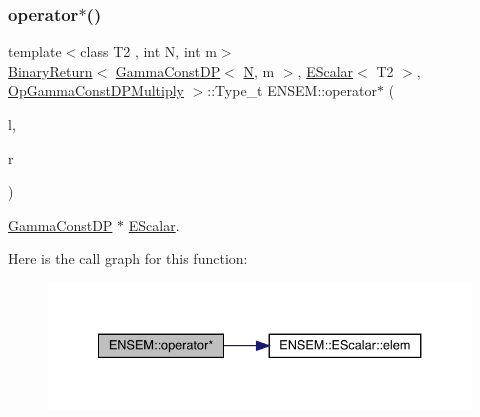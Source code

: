 \subsubsection{\texorpdfstring{operator$\ast$()}{operator*()}\hspace{0.1cm}{\footnotesize\ttfamily [6/9]}}
{\footnotesize\ttfamily template$<$class T2 , int N, int m$>$ \\
\mbox{\hyperlink{structENSEM_1_1BinaryReturn}{Binary\+Return}}$<$ \mbox{\hyperlink{classENSEM_1_1GammaConstDP}{Gamma\+Const\+DP}}$<$ \mbox{\hyperlink{operator__name__util_8cc_a7722c8ecbb62d99aee7ce68b1752f337}{N}}, m $>$, \mbox{\hyperlink{classENSEM_1_1EScalar}{E\+Scalar}}$<$ T2 $>$, \mbox{\hyperlink{structENSEM_1_1OpGammaConstDPMultiply}{Op\+Gamma\+Const\+D\+P\+Multiply}} $>$\+::Type\+\_\+t E\+N\+S\+E\+M\+::operator$\ast$ (\begin{DoxyParamCaption}\item[{const \mbox{\hyperlink{classENSEM_1_1GammaConstDP}{Gamma\+Const\+DP}}$<$ \mbox{\hyperlink{operator__name__util_8cc_a7722c8ecbb62d99aee7ce68b1752f337}{N}}, m $>$ \&}]{l,  }\item[{const \mbox{\hyperlink{classENSEM_1_1EScalar}{E\+Scalar}}$<$ T2 $>$ \&}]{r }\end{DoxyParamCaption})\hspace{0.3cm}{\ttfamily [inline]}}



\mbox{\hyperlink{classENSEM_1_1GammaConstDP}{Gamma\+Const\+DP}} $\ast$ \mbox{\hyperlink{classENSEM_1_1EScalar}{E\+Scalar}}. 

Here is the call graph for this function\+:
\nopagebreak
\begin{figure}[H]
\begin{center}
\leavevmode
\includegraphics[width=334pt]{d4/dca/group__escalar_ga37b9d878f5157952ec965d47a1032bc0_cgraph}
\end{center}
\end{figure}
\mbox{\label{group__escalar_gaa60096d471282c83dab865d42b53ce96}} 
